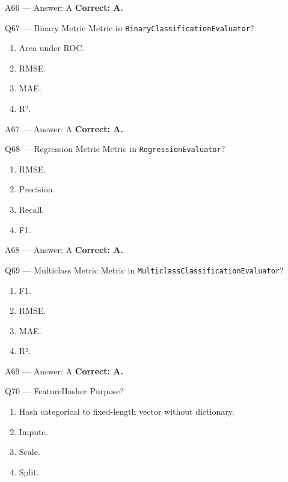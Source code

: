 \documentclass[aspectratio=169,9pt]{beamer}
\begin{document}
	\begin{frame}{A66 — Answer: A}
		\textbf{Correct: A.}
	\end{frame}
	
	\begin{frame}{Q67 — Binary Metric}
		Metric in \texttt{BinaryClassificationEvaluator}?
		\begin{enumerate}[label=\Alph*.]
			\item Area under ROC.
			\item RMSE.
			\item MAE.
			\item R².
		\end{enumerate}
	\end{frame}
	
	\begin{frame}{A67 — Answer: A}
		\textbf{Correct: A.}
	\end{frame}
	
	\begin{frame}{Q68 — Regression Metric}
		Metric in \texttt{RegressionEvaluator}?
		\begin{enumerate}[label=\Alph*.]
			\item RMSE.
			\item Precision.
			\item Recall.
			\item F1.
		\end{enumerate}
	\end{frame}
	
	\begin{frame}{A68 — Answer: A}
		\textbf{Correct: A.}
	\end{frame}
	
	\begin{frame}{Q69 — Multiclass Metric}
		Metric in \texttt{MulticlassClassificationEvaluator}?
		\begin{enumerate}[label=\Alph*.]
			\item F1.
			\item RMSE.
			\item MAE.
			\item R².
		\end{enumerate}
	\end{frame}
	
	\begin{frame}{A69 — Answer: A}
		\textbf{Correct: A.}
	\end{frame}
	
	\begin{frame}{Q70 — FeatureHasher}
		Purpose?
		\begin{enumerate}[label=\Alph*.]
			\item Hash categorical to fixed-length vector without dictionary.
			\item Impute.
			\item Scale.
			\item Split.
		\end{enumerate}
	\end{frame}
	
\end{document}
